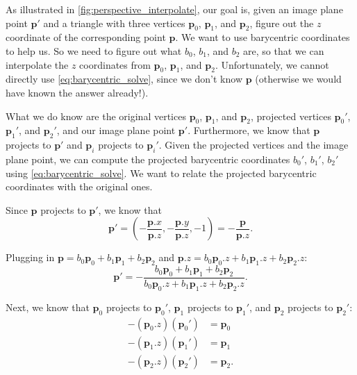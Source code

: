 As illustrated in \cref{fig:perspective_interpolate}, our goal is, given an image plane point $\mathbf{p}'$ and a triangle with three vertices $\mathbf{p}_0$, $\mathbf{p}_1$, and $\mathbf{p}_2$, figure out the $z$ coordinate of the corresponding point $\mathbf{p}$. We want to use barycentric coordinates to help us. So we need to figure out what $b_0$, $b_1$, and $b_2$ are, so that we can interpolate the $z$ coordinates from $\mathbf{p}_0$, $\mathbf{p}_1$, and $\mathbf{p}_2$. Unfortunately, we cannot directly use \cref{eq:barycentric_solve}, since we don't know $\mathbf{p}$ (otherwise we would have known the answer already!). 

What we do know are the original vertices $\mathbf{p}_0$, $\mathbf{p}_1$, and $\mathbf{p}_2$, projected vertices $\mathbf{p}_0'$, $\mathbf{p}_1'$, and $\mathbf{p}_2'$, and our image plane point $\mathbf{p}'$. Furthermore, we know that $\mathbf{p}$ projects to $\mathbf{p}'$ and $\mathbf{p}_i$ projects to $\mathbf{p}_i'$. Given the projected vertices and the image plane point, we can compute the projected barycentric coordinates $b_0'$, $b_1'$, $b_2'$ using \cref{eq:barycentric_solve}. We want to relate the projected barycentric coordinates with the original ones.

Since $\mathbf{p}$ projects to $\mathbf{p}'$, we know that
\begin{equation}
\mathbf{p}' = \left(-\frac{\mathbf{p}.x}{\mathbf{p}.z}, -\frac{\mathbf{p}.y}{\mathbf{p}.z}, -1\right) 
= -\frac{\mathbf{p}}{\mathbf{p}.z}.
\end{equation}

Plugging in $\mathbf{p} = b_0 \mathbf{p}_0 + b_1 \mathbf{p}_1 + b_2 \mathbf{p}_2$ and $\mathbf{p}.z = b_0 \mathbf{p}_0.z + b_1 \mathbf{p}_1.z + b_2 \mathbf{p}_2.z$:
\begin{equation}
\mathbf{p}' = -\frac{b_0 \mathbf{p}_0 + b_1 \mathbf{p}_1 + b_2 \mathbf{p}_2}{b_0 \mathbf{p}_0.z + b_1 \mathbf{p}_1.z + b_2 \mathbf{p}_2.z}.
\end{equation}

Next, we know that $\mathbf{p}_0$ projects to $\mathbf{p}_0'$, $\mathbf{p}_1$ projects to $\mathbf{p}_1'$, and $\mathbf{p}_2$ projects to $\mathbf{p}_2'$:
\begin{equation}
\begin{aligned}
-\left(\mathbf{p}_0.z\right) \left(\mathbf{p}_0'\right) &= \mathbf{p}_0 \\
-\left(\mathbf{p}_1.z\right) \left(\mathbf{p}_1'\right) &= \mathbf{p}_1 \\
-\left(\mathbf{p}_2.z\right) \left(\mathbf{p}_2'\right) &= \mathbf{p}_2.
\end{aligned}
\end{equation}

